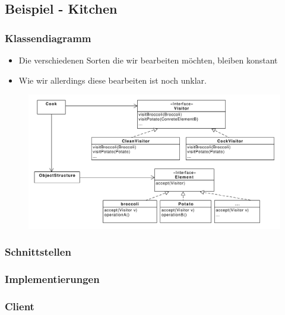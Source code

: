 \subsection{Beispiel - Kitchen}
\begin{frame}
	\frametitle{Klassendiagramm}
	\begin{itemize}
		\item Die verschiedenen Sorten die wir bearbeiten möchten, bleiben konstant
		\item Wie wir allerdings diese bearbeiten ist noch unklar.
	\end{itemize}	
	
  	\begin{figure}
		\includegraphics[scale=.3]{paper/visitor/kitchen}
	\end{figure}
\end{frame}



\begin{frame}
	\frametitle{Schnittstellen}
  	\begin{figure}
	\end{figure}
\end{frame}

\begin{frame}
	\frametitle{Implementierungen}
  	\begin{figure}
	\end{figure}
\end{frame}

\begin{frame}
	\frametitle{Client}
  	\begin{figure}
	\end{figure}
\end{frame}


